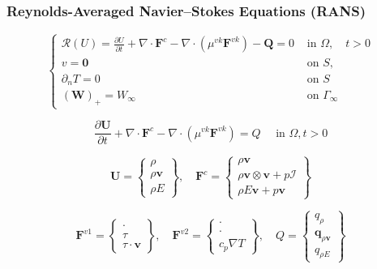 \begin{frame}[allowframebreaks]
\frametitle{Reynolds-Averaged Navier–Stokes Equations (RANS)}
\begin{equation}
\left\{\begin{array}{ll}{\mathcal{R}(U)=\frac{\partial U}{\partial t}+\nabla \cdot \boldsymbol{F}^{c}-\nabla \cdot\left(\mu^{v k} \boldsymbol{F}^{v k}\right)-\boldsymbol{Q}=0} & {\text { in } \Omega, \quad t>0} \\ {v=\mathbf{0}} & {\text { on }S,} \\ {\partial_{n} T=0} & {\text { on } S} \\ {(\boldsymbol{W})_{+}=W_{\infty}} & {\text { on } \Gamma_{\infty}}\end{array}\right.
\end{equation}


\begin{equation*}
\frac{\partial \boldsymbol{U}}{\partial t}+\nabla \cdot \boldsymbol{F}^{c}-\nabla \cdot\left(\mu^{v k} \boldsymbol{F}^{v k}\right)=Q \quad \text { in } \Omega, t>0
\end{equation*}

\framebreak

\begin{equation*}
\boldsymbol{U}=\left\{\begin{array}{c}{\rho } \\ {\rho \boldsymbol{v} } \\ {\rho E}\end{array}\right\},\quad
\boldsymbol{F}^{c}=\left\{\begin{array}{c}{\rho \boldsymbol{v}} \\ {\rho \boldsymbol{v} \otimes \boldsymbol{v}+ p\mathcal{I} } \\ {\rho E \boldsymbol{v}+p \boldsymbol{v}}\end{array}\right\}
\end{equation*}

\begin{equation*}
\boldsymbol{F}^{v1}=\left\{\begin{array}{c}{\cdot} \\ {\mathcal{\tau}} \\ {\mathcal{\tau} \cdot \boldsymbol{v}}\end{array}\right\},\quad
\boldsymbol{F}^{v2}=\left\{\begin{array}{c}{\cdot} \\ {\cdot} \\ {c_p \nabla T}\end{array}\right\},\quad
Q=\left\{\begin{array}{c}{q_\rho} \\ {\boldsymbol{q}_{\rho\boldsymbol{v}}} \\ {q_{\rho E}}\end{array}\right\}
\end{equation*}


\end{frame}
